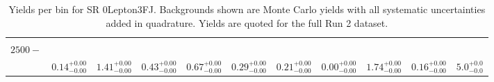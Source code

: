 \begin{table}[!htbp]
\begin{tabular}{c|c|c|c|c|c|c|c|c|c||c}
    \hline
    \pbox{20cm}{ ~ \\$2500-$\\ } & $0.14  ^{+0.00}_{-0.00}$ & $1.41  ^{+0.00}_{-0.00}$ & $0.43  ^{+0.00}_{-0.00}$ & $0.67  ^{+0.00}_{-0.00}$ & $0.29  ^{+0.00}_{-0.00}$ & $0.21  ^{+0.00}_{-0.00}$ & $0.00  ^{+0.00}_{-0.00}$ & $1.74  ^{+0.00}_{-0.00}$ & $0.16  ^{+0.00}_{-0.00}$ & $5.0  ^{+0.0}_{-0.0}$\\
\end{tabular}
    \caption{Yields per bin for SR 0Lepton3FJ. Backgrounds shown are Monte Carlo yields with all systematic uncertainties added in quadrature. Yields are quoted for the full Run 2 dataset.}
    \label{tab:0Lepton3FJ$binssyst}
\end{table}
